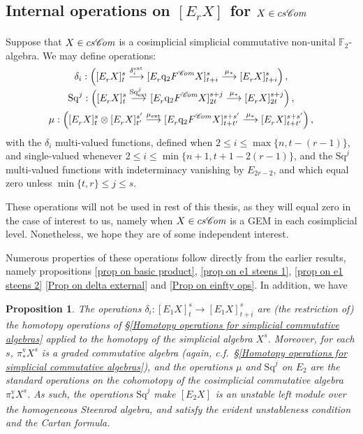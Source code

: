 \documentclass[11pt]{amsart} \renewcommand{\baselinestretch}{1.2}
\theoremstyle{plain}
\newtheorem{prop}[thm]{Proposition}
\numberwithin{equation}{section} %
\theoremstyle{plain}
\newtheorem{prop}[thm]{Proposition}
\numberwithin{equation}{chapter} %
\renewcommand{\to}{\longrightarrow}
\newcommand{\scrC}{\mathscr{C}}
\newcommand{\quadgrad}[1]{\mathrm{q}_{#1}}
\newcommand{\Sq}{\mathrm{Sq}}
\newcommand{\F}{\mathbb{F}}
\newcommand{\algs}{{\scrC\!\textit{\normalfont\textit{om}}}}
\newcommand{\E}[5]{[E^{#1}_{#2}#3]^{#4}_{#5}}
\newcommand{\Edownup}[5]{[E_{#1}^{#2}#3]^{#4}_{#5}}
\newcommand{\uver}{^\mathrm{v}}
\newcommand{\SubsectionOrSection}[1]{\subsection{#1}}
\begin{document}
\begin{second quadrant homotopy sseq operations}
\SubsectionOrSection{Internal operations on $\E{}{r}{X}{}{}$ for $X\in cs\algs$}
\label{The case of a cosimplicial simplicial commutative algebra}
Suppose that $X\in cs\algs$ is a cosimplicial simplicial commutative non-unital $\F_2$-algebra. We may define operations:
\begin{gather*}
\delta_i:\left(\Edownup{r}{}{X}{s}{t} \smash{{}\overset{\delta_i^\textup{ext}}{\to}{}} \Edownup{r}{}{\quadgrad{2}F^\algs X}{s}{t+i}\overset{\mu_*}{\to} 
\Edownup{r}{}{X}{s}{t+i}\right),
\\
\Sq^j:\left(\Edownup{r}{}{X}{s}{t}   \smash{{}\overset{\Sq^j_\textup{ext}}{\to}{}} \Edownup{r}{}{\quadgrad{2}F^\algs X}{s+j}{2t}\overset{\mu_*}{\to} 
\Edownup{r}{}{X}{s+j}{2t}\right),\\
\mu:\left(\Edownup{r}{}{X}{s}{t}\otimes \Edownup{r}{}{X}{s'}{t'}\smash{{}\overset{\mu_\textup{ext}}{\to}{}} \Edownup{r}{}{\quadgrad{2}F^\algs X}{s+s'}{t+t'}\overset{\mu_*}{\to} 
\Edownup{r}{}{X}{s+s'}{t+t'}\right),
\end{gather*}
with the $\delta_i$  multi-valued functions,  defined when $2\leq i\leq \max\{n,t-(r-1)\}$, and single-valued whenever $2\leq i\leq\min\{n+1,t+1-2(r-1)\}$, and the $\Sq^j$  multi-valued functions with indeterminacy vanishing by $E_{2r-2}$, and which equal zero unless $\min\{t,r\}\leq j\leq s$. 

These operations will not be used in rest of this thesis, as they will equal zero in the case of interest to us, namely when $X\in cs\algs$ is a GEM in each cosimplicial level. Nonetheless, we hope they are of some independent interest. 

Numerous properties of these operations follow directly from the earlier results, namely propositions \ref{prop on basic product}, \ref{prop on e1 steens 1}, \ref{prop on e1 steens 2} \ref{Prop on delta external} and \ref{Prop on einfty ops}. In addition, we have


\begin{prop}
\label{final generic prop for basic sseq ops}
The operations $\delta_i:\Edownup{1}{}{X}{s}{t}\to \Edownup{1}{}{X}{s}{t+i}$
are (the restriction of) the homotopy operations of \S\ref{Homotopy operations for simplicial commutative algebras} applied to the homotopy of the simplicial algebra $X^{s}$. Moreover, for each $s$, $\pi\uver_*X^s$ is a graded commutative algebra (again, c.f.\ \S\ref{Homotopy operations for simplicial commutative algebras}), and the operations $\mu$ and $\Sq^j$ on $E_2$ are the standard operations on the cohomotopy of the cosimplicial commutative algebra $\pi\uver_*X^s$. As such, the operations $\Sq^j$ make $\Edownup{2}{}{X}{}{}$ is an unstable left module over the homogeneous Steenrod algebra, and satisfy the evident unstableness condition and the Cartan formula.


\end{prop}
\end{second quadrant homotopy sseq operations}
\end{document}
